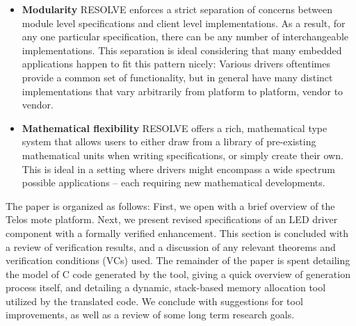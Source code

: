 \begin{itemize}
\item \textbf{Modularity} RESOLVE enforces a strict separation of concerns between module level specifications and client level implementations. As a result, for any one particular specification, there can be any number of interchangeable implementations. This separation is ideal considering that many embedded applications happen to fit this pattern nicely: Various drivers oftentimes provide a common set of functionality, but in general have many distinct implementations that vary arbitrarily from platform to platform, vendor to vendor.

\item \textbf{Mathematical flexibility} RESOLVE offers a rich, mathematical type system that allows users to either draw from a library of pre-existing mathematical units when writing specifications, or simply create their own. This is ideal in a setting where drivers might encompass a wide spectrum possible applications -- each requiring new mathematical developments.

\end{itemize}

The paper is organized as follows: First, we open with a brief overview of the Telos mote platform. Next, we present revised specifications of an LED driver component with a formally verified enhancement. This section is concluded with a review of verification results, and a discussion of any relevant theorems and verification conditions (VCs) used. The remainder of the paper is spent detailing the model of C code generated by the tool, giving a quick overview of generation process itself, and detailing a dynamic, stack-based memory allocation tool utilized by the translated code. We conclude with suggestions for tool improvements, as well as a review of some long term research goals.